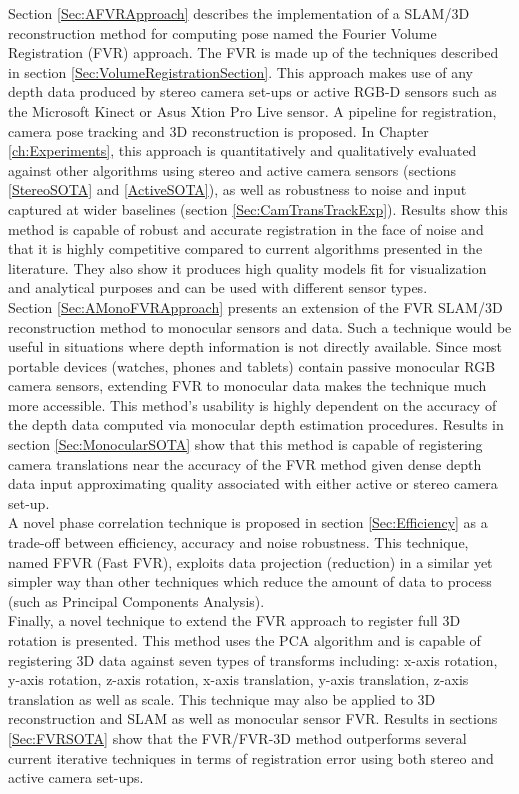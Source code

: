 Section \ref{Sec:AFVRApproach} describes the implementation of a SLAM/3D reconstruction method for computing pose named the Fourier Volume Registration (FVR) approach. The FVR is made up of the techniques described in section \ref{Sec:VolumeRegistrationSection}. This approach makes use of any depth data produced by stereo camera set-ups or active RGB-D sensors such as the Microsoft Kinect or Asus Xtion Pro Live sensor. A pipeline for registration, camera pose tracking and 3D reconstruction is proposed. In Chapter \ref{ch:Experiments}, this approach is quantitatively and qualitatively evaluated against other algorithms using stereo and active camera sensors (sections \ref{StereoSOTA} and \ref{ActiveSOTA}), as well as robustness to noise and input captured at wider baselines (section \ref{Sec:CamTransTrackExp}). Results show this method is capable of robust and accurate registration in the face of noise and that it is highly competitive compared to current algorithms presented in the literature. They also show it produces high quality models fit for visualization and analytical purposes and can be used with different sensor types.  \\

Section \ref{Sec:AMonoFVRApproach} presents an extension of the FVR SLAM/3D reconstruction method to monocular sensors and data. Such a technique would be useful in situations where depth information is not directly available. Since most portable devices (watches, phones and tablets) contain passive monocular RGB camera sensors, extending FVR to monocular data makes the technique much more accessible. This method's usability is highly dependent on the accuracy of the depth data computed via monocular depth estimation procedures. Results in section \ref{Sec:MonocularSOTA} show that this method is capable of registering camera translations near the accuracy of the FVR method given dense depth data input approximating quality associated with either active or stereo camera set-up.  \\

A novel phase correlation technique is proposed in section \ref{Sec:Efficiency} as a trade-off between efficiency, accuracy and noise robustness. This technique, named FFVR (Fast FVR), exploits data projection (reduction) in a similar yet simpler way than other techniques which reduce the amount of data to process (such as Principal Components Analysis). \\

Finally, a novel technique to extend the FVR approach to register full 3D rotation is presented. This method uses the PCA algorithm and is capable of registering 3D data against seven types of transforms including: x-axis rotation, y-axis rotation, z-axis rotation, x-axis translation, y-axis translation, z-axis translation as well as scale. This technique may also be applied to 3D reconstruction and SLAM as well as monocular sensor FVR. Results in sections \ref{Sec:FVRSOTA} show that the FVR/FVR-3D method outperforms several current iterative techniques in terms of registration error using both stereo and active camera set-ups.  \\
